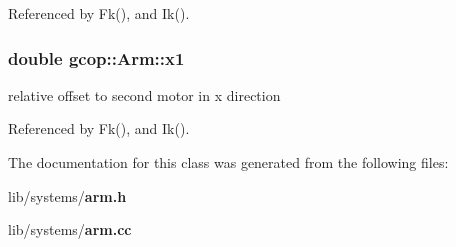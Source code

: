 \-Referenced by \-Fk(), and \-Ik().

\subsubsection[{x1}]{\setlength{\rightskip}{0pt plus 5cm}double {\bf gcop\-::\-Arm\-::x1}}\label{classgcop_1_1Arm_a0b3595f92385473924397849527473dd}


relative offset to second motor in x direction 



\-Referenced by \-Fk(), and \-Ik().



\-The documentation for this class was generated from the following files\-:\begin{DoxyCompactItemize}
\item 
lib/systems/{\bf arm.\-h}\item 
lib/systems/{\bf arm.\-cc}\end{DoxyCompactItemize}
